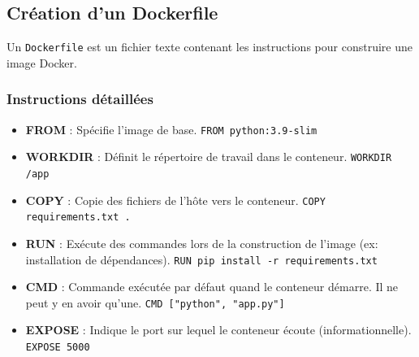 \documentclass[a4paper,12pt]{article}
\begin{document}
\subsection{Création d'un Dockerfile}
Un \texttt{Dockerfile} est un fichier texte contenant les instructions pour construire une image Docker.

\subsubsection{Instructions détaillées}
\begin{itemize}
    \item \textbf{FROM} : Spécifie l'image de base. \texttt{FROM python:3.9-slim}
    \item \textbf{WORKDIR} : Définit le répertoire de travail dans le conteneur. \texttt{WORKDIR /app}
    \item \textbf{COPY} : Copie des fichiers de l'hôte vers le conteneur. \texttt{COPY requirements.txt .}
    \item \textbf{RUN} : Exécute des commandes lors de la construction de l'image (ex: installation de dépendances). \texttt{RUN pip install -r requirements.txt}
    \item \textbf{CMD} : Commande exécutée par défaut quand le conteneur démarre. Il ne peut y en avoir qu'une. \texttt{CMD ["python", "app.py"]}
    \item \textbf{EXPOSE} : Indique le port sur lequel le conteneur écoute (informationnelle). \texttt{EXPOSE 5000}
\end{itemize}
\end{document}

